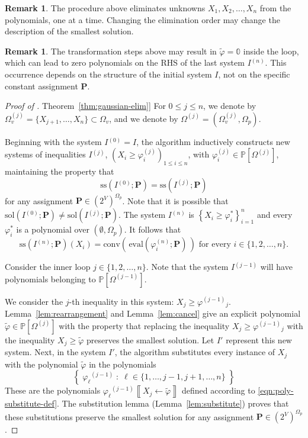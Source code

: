 \documentclass[10pt]{amsart}
\theoremstyle{plain}
\theoremstyle{definition}
\newtheorem{remark}[lemma]{Remark}
\providecommand{\namedref}[2]{\hyperref[#2]{#1~\ref*{#2}}\xspace}
\providecommand{\theoremref}[1]{\namedref{Theorem}{thm:#1}}
\providecommand{\bP}[0]{\ensuremath{\mathbf P}\xspace}
\let\leq\leqslant
\let\geq\geqslant
\providecommand{\p}[1]{\ensuremath{^{\left(#1\right)}}\xspace}
\providecommand{\conv}[1]{\ensuremath{\mathrm{conv}{\left({#1}\right)}\xspace}}
\providecommand{\sol}{\ensuremath{\mathrm{sol}}\xspace}
\providecommand{\ssol}{\ensuremath{\mathrm{ss}}\xspace}
\providecommand{\evalmap}[0]{\ensuremath{\mathrm{eval}}\xspace}
\let\phi\varphi
\begin{document}
\begin{remark}
    The procedure above eliminates unknowns $X_1, X_2, \dotsc, X_n$ from the polynomials, one at a time. 
    Changing the elimination order may change the description of the smallest solution. 
\end{remark}


\begin{remark}
    The transformation steps above may result in $\widetilde\varphi=\mathbb{0}$ inside the loop, which can lead to zero polynomials on the RHS of the last system $I\p n$. 
    This occurrence depends on the structure of the initial system $I$, not on the specific constant assignment $\bP$.
\end{remark}




\begin{proof}[Proof of \theoremref{gaussian-elim}]
For $0 \leq j \leq n$, we denote by $\Omega_v^{(j)} = \{X_{j+1},\ldots,X_n\} \subset \Omega_v$, and we denote by $\Omega^{(j)} = (\Omega_v^{(j)},\Omega_p)$.

Beginning with the system $I\p 0 = I$, the algorithm inductively constructs new systems of inequalities $I\p j$,
$\left(X_i \geq \varphi_i^{(j)}\right)_{1 \leq i \leq n}$, with 
$\phi_i^{(j)} \in \mathbb{P}[\Omega^{(j)}]$, maintaining the property that
\[
\ssol\left(I\p 0;\bP\right) =\ssol\left(I\p j;\bP\right)
\]
for any assignment $\bP \in (2^V)^{\Omega_p}$. 
Note that it is possible that 
$\sol\left(I\p 0;\bP\right) \neq \sol\left(I\p j;\bP\right)$.
The system $I\p n$ is $\left\{X_i\geq \varphi_i^*\right\}_{i=1}^n$ and every $\varphi^*_i$ is a polynomial over $(\emptyset,\Omega_p)$. 
It follows that 
\[
\ssol\left(I\p n ; \bP\right)(X_i) = 
\conv{ \, \evalmap(\varphi^{(n)}_i ; \bP) \, }\text{ for every }i\in\{1,2,\dotsc,n\}.
\]


Consider the inner loop $j\in\{1,2,\dotsc,n\}$. 
Note that the system $I\p{j-1}$ will have polynomials 
belonging to $\mathbb{P}[\Omega^{(j-1)}]$.

We consider the $j$-th inequality in this system: $ X_j \geq \varphi\p{j-1}_j$. 
Lemma~\ref{lem:rearrangement}  and Lemma~\ref{lem:cancel} give an explicit polynomial $\widetilde\varphi \in \mathbb{P}[\Omega^{(j)}]$ 
with the property that 
    replacing the inequality $ X_j \geq \varphi\p{j-1}_j$ with the inequality $X_j\geq \widetilde\varphi$ preserves the smallest solution. 
Let $I'$ represent this new system. 
Next, in the system $I'$, the algorithm substitutes every instance of $X_j$ with the polynomial $\widetilde\varphi$ in the polynomials 
    $$\left\{ \; \varphi_\ell\p{j-1} \;\colon\; \ell\in\{1,\dotsc, j-1,j+1,\dotsc, n\} \; \right\}$$
These are the polynomials $\varphi_\ell\p{j-1}\left\llbracket X_j\gets \widetilde\varphi \right\rrbracket$ defined according to \eqref{eqn:poly-substitute-def}. 
The substitution lemma (Lemma~\ref{lem:substitute}) proves that these substitutions preserve the smallest solution for any assignment $\bP \in (2^V)^{\Omega_p}$.


\end{proof}
\end{document}
